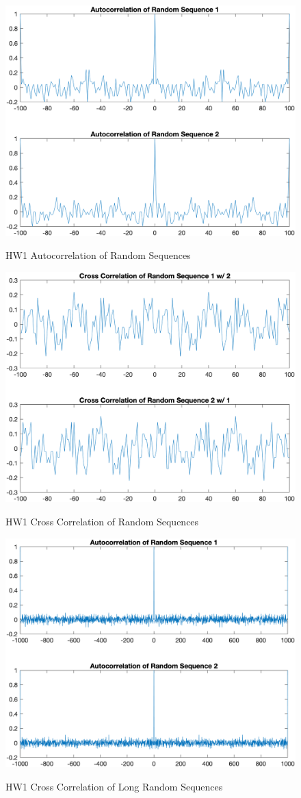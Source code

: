 \documentclass{article}
\begin{document}
\begin{figure}[H]
    \centering
    \includegraphics[width=0.75\linewidth]{../figures/p8_hw1_2c.png}\label{fig:p8_hw1_2c}
    \caption{HW1 Autocorrelation of Random Sequences}
\end{figure}
\begin{figure}[H]
    \centering
    \includegraphics[width=0.75\linewidth]{../figures/p8_hw1_2d.png}\label{fig:p8_hw1_2d}
    \caption{HW1 Cross Correlation of Random Sequences}
\end{figure}
\begin{figure}[H]
    \centering
    \includegraphics[width=0.75\linewidth]{../figures/p8_hw1_2bonus1.png}\label{fig:p8_hw1_2bonus1}
    \caption{HW1 Cross Correlation of Long Random Sequences}
\end{figure}
\end{document}
